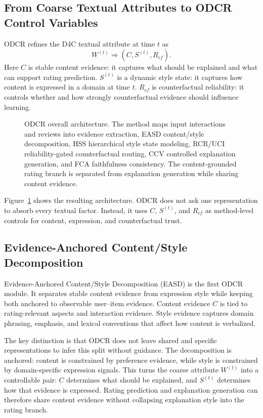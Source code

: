 \subsection{From Coarse Textual Attributes to ODCR Control Variables}

ODCR refines the D4C textual attribute at time \(t\) as
\[
  W^{(t)} \Rightarrow (C, S^{(t)}, R_{cf}) .
\]
Here \(C\) is stable content evidence: it captures what should be explained and
what can support rating prediction. \(S^{(t)}\) is a dynamic style state: it
captures how content is expressed in a domain at time \(t\). \(R_{cf}\) is
counterfactual reliability: it controls whether and how strongly
counterfactual evidence should influence learning.

\begin{figure}[t]
  \centering
  \resizebox{\textwidth}{!}{}
  \caption{ODCR overall architecture. The method maps input interactions and reviews into evidence extraction, EASD content/style decomposition, HSS hierarchical style state modeling, RCR/UCI reliability-gated counterfactual routing, CCV controlled explanation generation, and FCA faithfulness consistency. The content-grounded rating branch is separated from explanation generation while sharing content evidence.}
  \label{fig:overall_architecture}
\end{figure}

Figure~\ref{fig:overall_architecture} shows the resulting architecture. ODCR
does not ask one representation to absorb every textual factor. Instead, it
uses \(C\), \(S^{(t)}\), and \(R_{cf}\) as method-level controls for content,
expression, and counterfactual trust.

\subsection{Evidence-Anchored Content/Style Decomposition}

Evidence-Anchored Content/Style Decomposition (EASD) is the first ODCR module.
It separates stable content evidence from expression style while keeping both
anchored to observable user--item evidence. Content evidence \(C\) is tied to
rating-relevant aspects and interaction evidence. Style evidence captures
domain phrasing, emphasis, and lexical conventions that affect how content is
verbalized.

The key distinction is that ODCR does not leave shared and specific
representations to infer this split without guidance. The decomposition is
anchored: content is constrained by preference evidence, while style is
constrained by domain-specific expression signals. This turns the coarse
attribute \(W^{(t)}\) into a controllable pair: \(C\) determines what should be
explained, and \(S^{(t)}\) determines how that evidence is expressed. Rating
prediction and explanation generation can therefore share content evidence
without collapsing explanation style into the rating branch.

